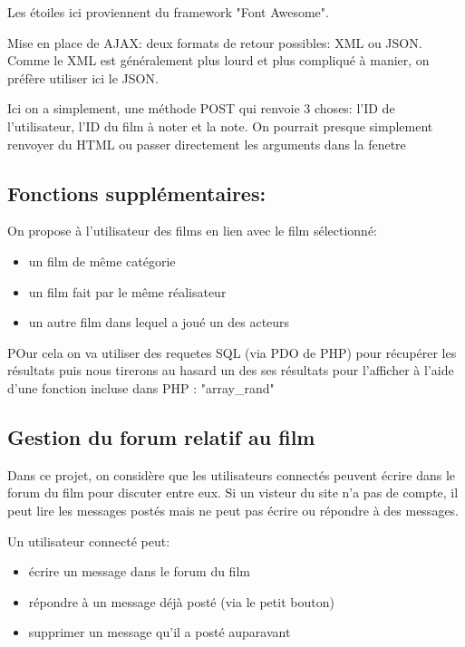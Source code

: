                     Les étoiles ici proviennent du framework "Font Awesome".

                    \bigskip
                    Mise en place de AJAX: deux formats de retour possibles: XML ou JSON. Comme le XML est généralement plus lourd et plus compliqué à manier, on préfère utiliser ici le JSON.

                    Ici on a simplement, une méthode POST qui renvoie 3 choses: l'ID de l'utilisateur, l'ID du film à noter et la note. On pourrait presque simplement renvoyer du HTML ou passer directement les arguments dans la fenetre


            \subsection{Fonctions supplémentaires:}

                On propose à l'utilisateur des films en lien avec le film sélectionné:
                \begin{itemize}
                    \item un film de même catégorie
                    \item un film fait par le même réalisateur
                    \item un autre film dans lequel a joué un des acteurs
                \end{itemize}

                POur cela on va utiliser des requetes SQL (via PDO de PHP) pour récupérer les résultats puis nous tirerons au hasard un des ses résultats pour l'afficher à l'aide d'une fonction incluse dans PHP : "array\_rand"

\subsection{Gestion du forum relatif au film}

                Dans ce projet, on considère que les utilisateurs connectés peuvent écrire dans le forum du film pour discuter entre eux. Si un visteur du site n'a pas de compte, il peut lire les messages postés mais ne peut pas écrire ou répondre à des messages.

                \medskip
                Un utilisateur connecté peut:
                \begin{itemize}
                    \item écrire un message dans le forum du film
                    \item répondre à un message déjà posté (via le petit bouton) 
                    \item supprimer un message qu'il a posté auparavant
                \end{itemize}


